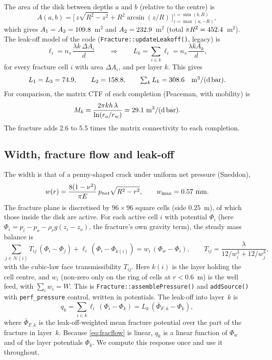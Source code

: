 \documentclass[11pt,a4paper]{article}
\newcommand{\Phiw}{\Phi_w}
\newcommand{\cond}{\si{m^3/(d\,bar)}}
\begin{document}
The area of the disk between depths $a$ and $b$ (relative to the centre) is
\begin{equation}
  A(a,b)=\Big[\,z\sqrt{R^2-z^2}+R^2\arcsin(z/R)\,\Big]_{z=\max(a,-R)}^{z=\min(b,R)} ,
\end{equation}
which gives $A_1=A_3=109.8$~m$^2$ and $A_2=232.9$~m$^2$ (total $\pi R^2=452.4$~m$^2$).
The leak-off model of the code (\texttt{Fracture::updateLeakoff()}, legacy) is
\begin{equation}
  \ell_i = n_s\,\frac{\lambda k\,\Delta A_i}{d}
  \qquad\Longrightarrow\qquad
  L_k=\sum_{i\in k}\ell_i = n_s\,\frac{\lambda k A_k}{d},
  \label{eq:leakcond}
\end{equation}
for every fracture cell $i$ with area $\Delta A_i$, and per layer $k$.  This gives
\[
  L_1=L_3=\Ltop,\qquad L_2=\Lmid,\qquad \textstyle\sum_k L_k=\Ltot\quad\text{\cond}.
\]
For comparison, the matrix CTF of each completion (Peaceman, with mobility) is
\begin{equation}
  M_k=\frac{2\pi k h\,\lambda}{\ln(r_o/r_w)}=\Mk\ \text{\cond}.
\end{equation}
The fracture adds 2.6 to 5.5 times the matrix connectivity to each completion.

\subsection{Width, fracture flow and leak-off}

The width is that of a penny-shaped crack under uniform net pressure (Sneddon),
\begin{equation}
  w(r)=\frac{8(1-\nu^2)}{\pi E}\,p_{net}\sqrt{R^2-r^2},\qquad w_{\max}=0.57\ \text{mm}.
\end{equation}
The fracture plane is discretised by $96\times96$ square cells (side $0.25$~m), of which those
inside the disk are active.  For each active cell $i$ with potential $\Phi_i$ (here
$\Phi_i=p_i-p_o-\rho_r g(z_i-z_o)$, the fracture's own gravity term), the steady mass balance
is
\begin{equation}
  \sum_{j\in\mathcal N(i)} T_{ij}\,(\Phi_i-\Phi_j)
  + \ell_i\,(\Phi_i-\Phi_{k(i)})
  = w_i\,(\Phiw-\Phi_i),
  \qquad
  T_{ij}=\frac{\lambda}{12/w_i^3+12/w_j^3},
  \label{eq:fracflow}
\end{equation}
with the cubic-law face transmissibility $T_{ij}$.  Here $k(i)$ is the layer holding the cell
centre, and $w_i$ (non-zero only on the ring of cells at $r<0.6$~m) is the well feed, with
$\sum_i w_i=W$.  This is \texttt{Fracture::assemblePressure()} and \texttt{addSource()} with
\texttt{perf\_pressure} control, written in potentials.  The leak-off into layer~$k$ is
\begin{equation}
  q_k=\sum_{i\in k}\ell_i\,(\Phi_i-\Phi_k)=L_k\,(\bar\Phi_{F,k}-\Phi_k),
  \label{eq:qk}
\end{equation}
where $\bar\Phi_{F,k}$ is the leak-off-weighted mean fracture potential over the part of the
fracture in layer~$k$.  Because \eqref{eq:fracflow} is linear, $q_k$ is a linear function of
$\Phiw$ and of the layer potentials $\Phi_k$.  We compute this response once and use it
throughout.
\end{document}
